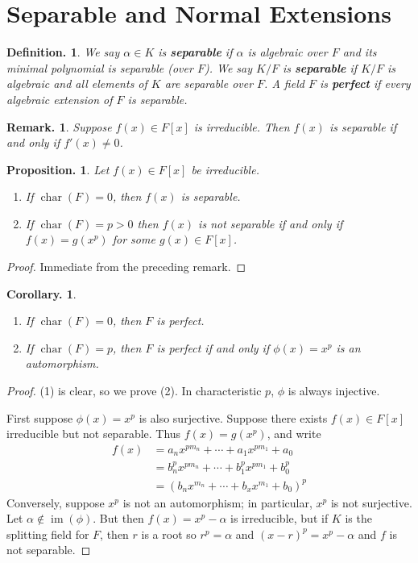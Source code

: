 \documentclass[11pt, a4paper]{memoir}
\newcommand{\mbf}[1]{{\boldmath\bfseries #1}}
\theoremstyle{change}
\newtheorem{corollary}[theorem]{Corollary.}
\newtheorem{proposition}[theorem]{Proposition.}
\theoremstyle{plain}
\theoremstyle{nonumberplain}
\newtheorem{definition}{Definition.}
\newtheorem{remark}{Remark.}
\newtheorem{proof}{Proof}
\DeclareMathOperator{\chr}{char}
\DeclareMathOperator{\im}{im}
\numberwithin{equation}{section}
\begin{document}
\section{Separable and Normal Extensions}
\begin{definition}
    We say $\alpha\in K$ is \mbf{separable} if $\alpha$ is algebraic over $F$ and its minimal polynomial is separable (over $F$).
    We say $K/F$ is \mbf{separable} if $K/F$ is algebraic and all elements of $K$ are separable over $F$.
    A field $F$ is \mbf{perfect} if every algebraic extension of $F$ is separable.
\end{definition}
\begin{remark}
    Suppose $f(x)\in F[x]$ is irreducible.
    Then $f(x)$ is separable if and only if $f'(x)\neq 0$.
\end{remark}
\begin{proposition}
    Let $f(x)\in F[x]$ be irreducible.
    \begin{enumerate}[nolistsep]
        \item If $\chr(F)=0$, then $f(x)$ is separable.
        \item If $\chr(F)=p>0$ then $f(x)$ is not separable if and only if $f(x)=g(x^p)$ for some $g(x)\in F[x]$.
    \end{enumerate}
\end{proposition}
\begin{proof}
    Immediate from the preceding remark.
\end{proof}
\begin{corollary}
    \begin{enumerate}[nl]
        \item If $\chr(F)=0$, then $F$ is perfect.
        \item If $\chr(F)=p$, then $F$ is perfect if and only if $\phi(x)=x^p$ is an automorphism.
    \end{enumerate}
\end{corollary}
\begin{proof}
    (1) is clear, so we prove (2).
    In characteristic $p$, $\phi$ is always injective.

    First suppose $\phi(x)=x^p$ is also surjective.
    Suppose there exists $f(x)\in F[x]$ irreducible but not separable.
    Thus $f(x)=g(x^p)$, and write
    \begin{align*}
        f(x) &=a_nx^{pm_n}+\cdots+a_1x^{pm_1}+a_0\\
             &=b_n^px^{pm_n}+\cdots+b_1^px^{pm_1}+b_0^p\\
             &= (b_nx^{m_n}+\cdots+b_xx^{m_1}+b_0)^p
    \end{align*}
    Conversely, suppose $x^p$ is not an automorphism; in particular, $x^p$ is not surjective.
    Let $\alpha\notin\im(\phi)$.
    But then $f(x)=x^p-\alpha$ is irreducible, but if $K$ is the splitting field for $F$, then $r$ is a root so $r^p=\alpha$ and $(x-r)^p=x^p-\alpha$ and $f$ is not separable.
\end{proof}
\end{document}
